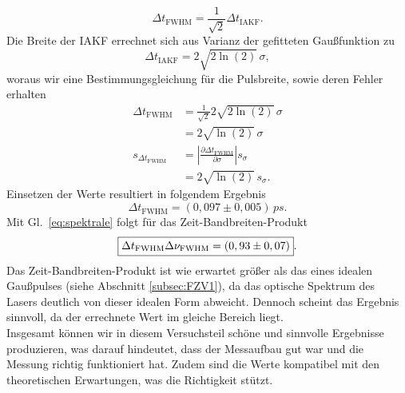 \begin{equation}
    \Delta t_{\text{FWHM}} = \frac{1}{\sqrt{2}}\Delta t_{\text{IAKF}}.
\end{equation}
Die Breite der IAKF errechnet sich aus Varianz der gefitteten Gaußfunktion zu
\begin{equation}
    \Delta t_{\text{IAKF}} = 2\sqrt{2\ln(2)}\,\sigma,
\end{equation}
woraus wir eine Bestimmungsgleichung für die Pulsbreite, sowie deren Fehler erhalten
\begin{align}
    \Delta t_{\text{FWHM}} &= \frac{1}{\sqrt{2}}2\sqrt{2\ln(2)}\,\sigma \\
    &= 2\sqrt{\ln(2)}\,\sigma \\
    s_{\Delta t_{\text{FWHM}}} &= \left\vert\frac{\partial \Delta t_{\text{FWHM}}}{\partial \sigma}\right\vert s_{\sigma} \\
    &= 2\sqrt{\ln(2)}\,s_{\sigma}.
\end{align}
Einsetzen der Werte resultiert in folgendem Ergebnis
\begin{equation}
    \Delta t_{\text{FWHM}} = (0,097 \pm 0,005)\,\si{ps}.
\end{equation}
Mit Gl.~\eqref{eq:spektrale} folgt für das Zeit-Bandbreiten-Produkt
\begin{equation}
    \fbox{$\Delta t_{\text{FWHM}}\Delta \nu_{\text{FWHM}} = (0,93 \pm 0,07)$}.
\end{equation}
Das Zeit-Bandbreiten-Produkt ist wie erwartet größer als das eines idealen Gaußpulses (siehe Abschnitt \ref{subsec:FZV1}),
da das optische Spektrum des Lasers deutlich von dieser idealen Form abweicht. Dennoch scheint das Ergebnis sinnvoll, da 
der errechnete Wert im gleiche Bereich liegt. \\
Insgesamt können wir in diesem Versuchsteil schöne und sinnvolle Ergebnisse produzieren, was darauf hindeutet, dass der 
Messaufbau gut war und die Messung richtig funktioniert hat. Zudem sind die Werte kompatibel mit den theoretischen 
Erwartungen, was die Richtigkeit stützt. \\
